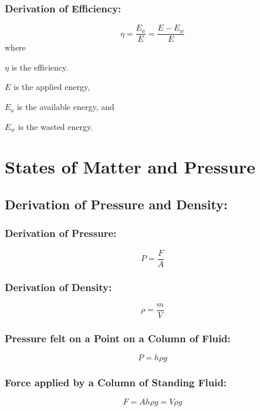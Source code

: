 \documentclass[a4paper]{report}
\begin{document}
        \subsection{Derivation of Efficiency: }
            \begin{equation}
                \eta = \frac{E_a}{E} = \frac{E - E_w}{E}
            \end{equation}
            where
            \begin{description}
                \item $\eta$ is the efficiency.
                \item $E$ is the applied energy,
                \item $E_a$ is the available energy, and
                \item $E_w$ is the wasted energy.
            \end{description}

            
\chapter{States of Matter and Pressure}
    \section{Derivation of Pressure and Density: }
        \subsection{Derivation of Pressure: }
            \begin{equation}
                P = \frac{F}{A}
            \end{equation}
        \subsection{Derivation of Density: }
            \begin{equation}
                \rho = \frac{m}{V}
            \end{equation}
        \subsection{Pressure felt on a Point on a Column of Fluid: }
            \begin{equation}
                P = h \rho g
            \end{equation}
        \subsection{Force applied by a Column of Standing Fluid: }
            \begin{equation}
                F = Ah \rho g = V \rho g
            \end{equation}
\end{document}
